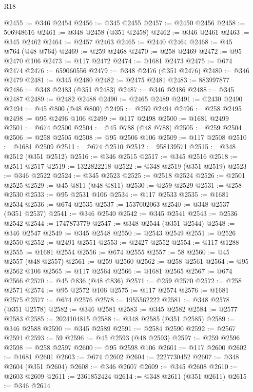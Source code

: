 \begin{lexlean}{R18}
\begin{coremodule}
@2455 := @346 @2454
@2456 := @345 @2455
@2457 := @2450 @2456
@2458 := 506948616
@2461 := @348 @2458 (@351 @2458)
@2462 := @346 @2461
@2463 := @345 @2462
@2464 := @2457 @2463
@2465 := @2440 @2464
@2468 := @45 @764 (@48 @764)
@2469 := @259 @2468
@2470 := @258 @2469
@2472 := @95 @2470 @106
@2473 := @117 @2472
@2474 := @1681 @2473
@2475 := @674 @2474
@2476 := 659060556
@2479 := @348 @2476 (@351 @2476)
@2480 := @346 @2479
@2481 := @345 @2480
@2482 := @2475 @2481
@2483 := 883997877
@2486 := @348 @2483 (@351 @2483)
@2487 := @346 @2486
@2488 := @345 @2487
@2489 := @2482 @2488
@2490 := @2465 @2489
@2491 := @2430 @2490
@2494 := @45 @800 (@48 @800)
@2495 := @259 @2494
@2496 := @258 @2495
@2498 := @95 @2496 @106
@2499 := @117 @2498
@2500 := @1681 @2499
@2501 := @674 @2500
@2504 := @45 @788 (@48 @788)
@2505 := @259 @2504
@2506 := @258 @2505
@2508 := @95 @2506 @106
@2509 := @117 @2508
@2510 := @1681 @2509
@2511 := @674 @2510
@2512 := 958139571
@2515 := @348 @2512 (@351 @2512)
@2516 := @346 @2515
@2517 := @345 @2516
@2518 := @2511 @2517
@2519 := 1322822218
@2522 := @348 @2519 (@351 @2519)
@2523 := @346 @2522
@2524 := @345 @2523
@2525 := @2518 @2524
@2526 := @2501 @2525
@2529 := @45 @811 (@48 @811)
@2530 := @259 @2529
@2531 := @258 @2530
@2533 := @95 @2531 @106
@2534 := @117 @2533
@2535 := @1681 @2534
@2536 := @674 @2535
@2537 := 1537002063
@2540 := @348 @2537 (@351 @2537)
@2541 := @346 @2540
@2542 := @345 @2541
@2543 := @2536 @2542
@2544 := 1747873779
@2547 := @348 @2544 (@351 @2544)
@2548 := @346 @2547
@2549 := @345 @2548
@2550 := @2543 @2549
@2551 := @2526 @2550
@2552 := @2491 @2551
@2553 := @2427 @2552
@2554 := @117 @1288
@2555 := @1681 @2554
@2556 := @674 @2555
@2557 := 58
@2560 := @45 @2557 (@48 @2557)
@2561 := @259 @2560
@2562 := @258 @2561
@2564 := @95 @2562 @106
@2565 := @117 @2564
@2566 := @1681 @2565
@2567 := @674 @2566
@2570 := @45 @836 (@48 @836)
@2571 := @259 @2570
@2572 := @258 @2571
@2574 := @95 @2572 @106
@2575 := @117 @2574
@2576 := @1681 @2575
@2577 := @674 @2576
@2578 := 1955562222
@2581 := @348 @2578 (@351 @2578)
@2582 := @346 @2581
@2583 := @345 @2582
@2584 := @2577 @2583
@2585 := 2024104815
@2588 := @348 @2585 (@351 @2585)
@2589 := @346 @2588
@2590 := @345 @2589
@2591 := @2584 @2590
@2592 := @2567 @2591
@2593 := 59
@2596 := @45 @2593 (@48 @2593)
@2597 := @259 @2596
@2598 := @258 @2597
@2600 := @95 @2598 @106
@2601 := @117 @2600
@2602 := @1681 @2601
@2603 := @674 @2602
@2604 := 2227730452
@2607 := @348 @2604 (@351 @2604)
@2608 := @346 @2607
@2609 := @345 @2608
@2610 := @2603 @2609
@2611 := 2361852424
@2614 := @348 @2611 (@351 @2611)
@2615 := @346 @2614

\end{coremodule}
\end{lexlean}
